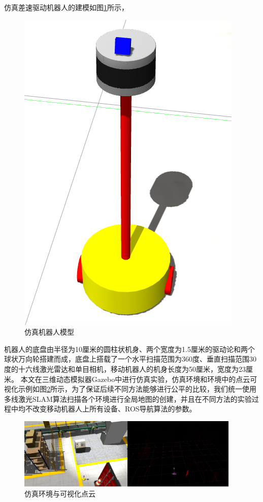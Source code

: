 仿真差速驱动机器人的建模如图\ref{sim_robot}所示，
\begin{figure}[htbp]
    \centering
    \includegraphics[scale=0.40]{Fig/sim_robot.png}
    \caption{\label{sim_robot}仿真机器人模型}
\end{figure}机器人的底盘由半径为10厘米的圆柱状机身、两个宽度为1.5厘米的驱动论和两个球状万向轮搭建而成，底盘上搭载了一个水平扫描范围为360度、垂直扫描范围30度的十六线激光雷达和单目相机，移动机器人的机身长度为50厘米，宽度为23厘米。
本文在三维动态模拟器Gazebo中进行仿真实验，仿真环境和环境中的点云可视化示例如图\ref{sim_world}所示，为了保证后续不同方法能够进行公平的比较，我们统一使用多线激光SLAM算法扫描各个环境进行全局地图的创建，并且在不同方法的实验过程中均不改变移动机器人上所有设备、ROS导航算法的参数。




\begin{figure}[htbp]
    \centering
    \includegraphics[width=0.95\textwidth]{Fig/sim_world.png}
    \caption{\label{sim_world}仿真环境与可视化点云}
\end{figure}


